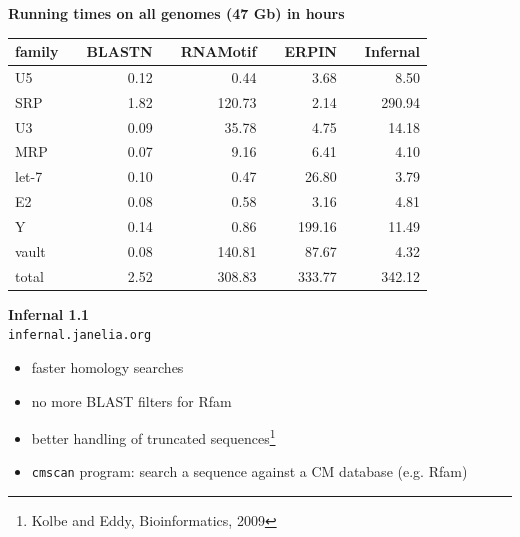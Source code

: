 \documentclass[landscape]{slides}
\begin{document}
\begin{slide}
\begin{center}
\textbf{Running times on all genomes (47 Gb) in hours}
\end{center}
\medskip

\normalsize
\begin{center}
\begin{tabular}{lrrrrrrrr}
  family  &  &    BLASTN  &  &  RNAMotif  &  &     ERPIN  &  &  Infernal \\ \hline
      U5  &  &      0.12  &  &      0.44  &  &      3.68  &  &      8.50 \\
     SRP  &  &      1.82  &  &    120.73  &  &      2.14  &  &    290.94 \\
      U3  &  &      0.09  &  &     35.78  &  &      4.75  &  &     14.18 \\
     MRP  &  &      0.07  &  &      9.16  &  &      6.41  &  &      4.10 \\
   let-7  &  &      0.10  &  &      0.47  &  &     26.80  &  &      3.79 \\
      E2  &  &      0.08  &  &      0.58  &  &      3.16  &  &      4.81 \\
       Y  &  &      0.14  &  &      0.86  &  &    199.16  &  &     11.49 \\
   vault  &  &      0.08  &  &    140.81  &  &     87.67  &  &      4.32 \\\hline
   total  &  &      2.52  &  &    308.83  &  &    333.77  &  &    342.12 \\
\end{tabular}
\end{center}

\vfill
\end{slide}
\begin{slide}
\begin{center}
\textbf{Infernal 1.1} \\ \texttt{infernal.janelia.org}
\end{center}
\medskip

\small
\begin{itemize}
\item faster homology searches
\item no more BLAST filters for Rfam
\item better handling of truncated sequences\footnote{Kolbe and Eddy,
  Bioinformatics, 2009}
\item \texttt{cmscan} program: search a sequence against a CM database
  (e.g. Rfam)
\end{itemize}

\vfill
\end{slide}
\end{document}
